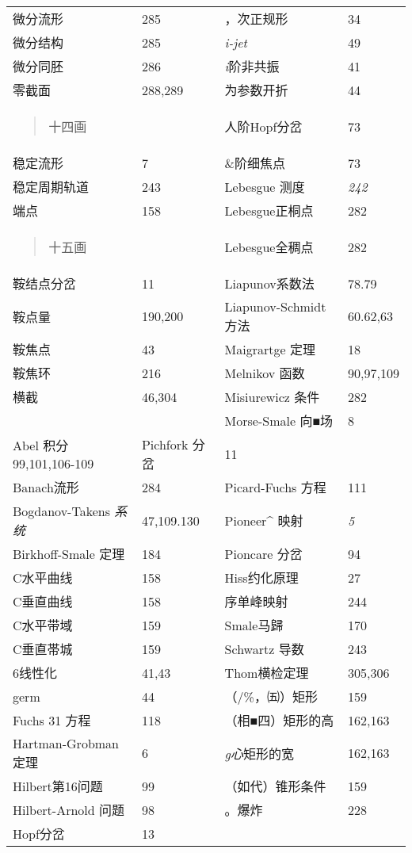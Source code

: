 \begin{longtable}[]{@{}llll@{}}
\toprule
\endhead
微分流形 & 285 & ，次正规形 & 34\tabularnewline
微分结构 & 285 & \emph{i-jet} & 49\tabularnewline
微分同胚 & 286 & \emph{i}阶非共振 & 41\tabularnewline
零截面 & 288,289 & 为参数开折 & 44\tabularnewline
\begin{minipage}[t]{0.22\columnwidth}\raggedright
\begin{quote}
十四画
\end{quote}\strut
\end{minipage} & \begin{minipage}[t]{0.22\columnwidth}\raggedright
\strut
\end{minipage} & \begin{minipage}[t]{0.22\columnwidth}\raggedright
人阶Hopf分岔\strut
\end{minipage} & \begin{minipage}[t]{0.22\columnwidth}\raggedright
73\strut
\end{minipage}\tabularnewline
稳定流形 & 7 & \&阶细焦点 & 73\tabularnewline
稳定周期轨道 & 243 & Lebesgue 测度 & \emph{242}\tabularnewline
端点 & 158 & Lebesgue正桐点 & 282\tabularnewline
\begin{minipage}[t]{0.22\columnwidth}\raggedright
\begin{quote}
十五画
\end{quote}\strut
\end{minipage} & \begin{minipage}[t]{0.22\columnwidth}\raggedright
\strut
\end{minipage} & \begin{minipage}[t]{0.22\columnwidth}\raggedright
Lebesgue全稠点\strut
\end{minipage} & \begin{minipage}[t]{0.22\columnwidth}\raggedright
282\strut
\end{minipage}\tabularnewline
鞍结点分岔 & 11 & Liapunov系数法 & 78.79\tabularnewline
鞍点量 & 190,200 & Liapunov-Schmidt 方法 & 60.62,63\tabularnewline
鞍焦点 & 43 & Maigrartge 定理 & 18\tabularnewline
鞍焦环 & 216 & Melnikov 函数 & 90,97,109\tabularnewline
横截 & 46,304 & Misiurewicz 条件 & 282\tabularnewline
& & Morse-Smale 向■场 & 8\tabularnewline
Abel 积分 99,101,106-109 & Pichfork 分岔 & 11 &\tabularnewline
Banach流形 & 284 & Picard-Fuchs 方程 & 111\tabularnewline
Bogdanov-Takens \emph{系统} & 47,109.130 & Pioneer\^{} 映射 &
\emph{5}\tabularnewline
Birkhoff-Smale 定理 & 184 & Pioncare 分岔 & 94\tabularnewline
C水平曲线 & 158 & Hiss约化原理 & 27\tabularnewline
C垂直曲线 & 158 & 序单峰映射 & 244\tabularnewline
C水平带域 & 159 & Smale马歸 & 170\tabularnewline
C垂直帯城 & 159 & Schwartz 导数 & 243\tabularnewline
6线性化 & 41,43 & Thom横检定理 & 305,306\tabularnewline
germ & 44 & （/\%，㈤）矩形 & 159\tabularnewline
Fuchs 31 方程 & 118 & （相■四）矩形的高 & 162,163\tabularnewline
Hartman-Grobman 定理 & 6 & \emph{g心}矩形的宽 & 162,163\tabularnewline
Hilbert第16问题 & 99 & （如代）锥形条件 & 159\tabularnewline
Hilbert-Arnold 问题 & 98 & 。爆炸 & 228\tabularnewline
Hopf分岔 & 13 & &\tabularnewline
\bottomrule
\end{longtable}

